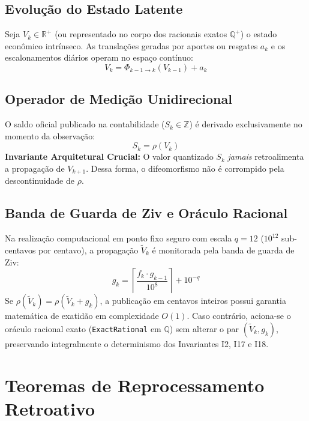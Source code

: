 \documentclass[11pt,a4paper]{article}
\theoremstyle{definition}
\theoremstyle{remark}
\begin{document}
\subsection{Evolução do Estado Latente}

Seja $V_k \in \mathbb{R}^+$ (ou representado no corpo dos racionais exatos $\mathbb{Q}^+$) o estado econômico intrínseco. As translações geradas por aportes ou resgates $a_k$ e os escalonamentos diários operam no espaço contínuo:
\begin{equation}
    V_k = \Phi_{k-1 \to k}(V_{k-1}) + a_k
\end{equation}

\subsection{Operador de Medição Unidirecional}

O saldo oficial publicado na contabilidade ($S_k \in \mathbb{Z}$) é derivado exclusivamente no momento da observação:
\begin{equation}
    S_k = \rho(V_k)
\end{equation}
\textbf{Invariante Arquitetural Crucial:} O valor quantizado $S_k$ \emph{jamais} retroalimenta a propagação de $V_{k+1}$. Dessa forma, o difeomorfismo não é corrompido pela descontinuidade de $\rho$.

\subsection{Banda de Guarda de Ziv e Oráculo Racional}

Na realização computacional em ponto fixo seguro com escala $q = 12$ ($10^{12}$ sub-centavos por centavo), a propagação $\tilde{V}_k$ é monitorada pela banda de guarda de Ziv:
\begin{equation}
    g_k = \left\lceil \frac{f_k \cdot g_{k-1}}{10^8} \right\rceil + 10^{-q}
\end{equation}
Se $\rho(\tilde{V}_k) = \rho(\tilde{V}_k + g_k)$, a publicação em centavos inteiros possui garantia matemática de exatidão em complexidade $O(1)$. Caso contrário, aciona-se o oráculo racional exato (\texttt{ExactRational} em $\mathbb{Q}$) sem alterar o par $(\tilde{V}_k, g_k)$, preservando integralmente o determinismo dos Invariantes I2, I17 e I18.

\section{Teoremas de Reprocessamento Retroativo}
\end{document}
